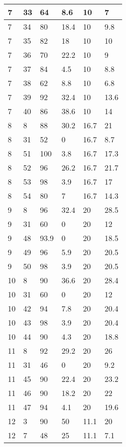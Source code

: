 \begin{longtable}[c]{ | p{2cm} | p{2cm} | p{2cm} | p{2cm} | p{3cm} | p{3cm} | }
	\hline
	7 & 33 & 64 & 8.6 & 10 & 7 \\
	\hline
	7 & 34 & 80 & 18.4 & 10 & 9.8 \\
	\hline
	7 & 35 & 82 & 18 & 10 & 10 \\
	\hline
	7 & 36 & 70 & 22.2 & 10 & 9 \\
	\hline
	7 & 37 & 84 & 4.5 & 10 & 8.8 \\
	\hline
	7 & 38 & 62 & 8.8 & 10 & 6.8 \\
	\hline
	7 & 39 & 92 & 32.4 & 10 & 13.6 \\
	\hline
	7 & 40 & 86 & 38.6 & 10 & 14 \\
	\hline
	\hline
	\hline
	8 & 8 & 88 & 30.2 & 16.7 & 21 \\
	\hline
	8 & 31 & 52 & 0 & 16.7 & 8.7 \\
	\hline
	8 & 51 & 100 & 3.8 & 16.7 & 17.3 \\
	\hline
	8 & 52 & 96 & 26.2 & 16.7 & 21.7 \\
	\hline
	8 & 53 & 98 & 3.9 & 16.7 & 17 \\
	\hline
	8 & 54 & 80 & 7 & 16.7 & 14.3 \\
	\hline
	\hline
	\hline
	9 & 8 & 96 & 32.4 & 20 & 28.5 \\
	\hline
	9 & 31 & 60 & 0 & 20 & 12 \\
	\hline
	9 & 48 & 93.9 & 0 & 20 & 18.5 \\
	\hline
	9 & 49 & 96 & 5.9 & 20 & 20.5 \\
	\hline
	9 & 50 & 98 & 3.9 & 20 & 20.5 \\
	\hline
	\hline
	\hline
	10 & 8 & 90 & 36.6 & 20 & 28.4 \\
	\hline
	10 & 31 & 60 & 0 & 20 & 12 \\
	\hline
	10 & 42 & 94 & 7.8 & 20 & 20.4 \\
	\hline
	10 & 43 & 98 & 3.9 & 20 & 20.4 \\
	\hline
	10 & 44 & 90 & 4.3 & 20 & 18.8 \\
	\hline
	\hline
	\hline
	11 & 8 & 92 & 29.2 & 20 & 26 \\
	\hline
	11 & 31 & 46 & 0 & 20 & 9.2 \\
	\hline
	11 & 45 & 90 & 22.4 & 20 & 23.2 \\
	\hline
	11 & 46 & 90 & 18.2 & 20 & 22 \\
	\hline
	11 & 47 & 94 & 4.1 & 20 & 19.6 \\
	\hline
	\hline
	\hline
	12 & 3 & 90 & 50 & 11.1 & 20 \\
	\hline
	12 & 7 & 48 & 25 & 11.1 & 7.1 \\

\end{longtable}

